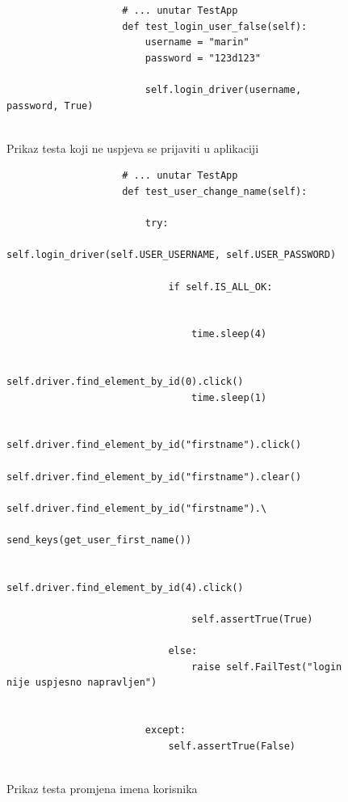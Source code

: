 			\begin{figure}[H]
				\begin{lstlisting}
					# ... unutar TestApp
				    def test_login_user_false(self):
						username = "marin"
						password = "123d123"
						
						self.login_driver(username, password, True)	
			
				\end{lstlisting}
				
			
				\centering
				\caption{Prikaz testa koji ne uspjeva se prijaviti u aplikaciji}
				\label{fig:test - sistemski - neuspjela prijava korisnika}
			\end{figure}			
			\eject 
		
			\begin{figure}[H]
								\begin{lstlisting}
					# ... unutar TestApp
					def test_user_change_name(self):
					
						try:
							self.login_driver(self.USER_USERNAME, self.USER_PASSWORD)
							
							if self.IS_ALL_OK:
							
								
								time.sleep(4)
								
								self.driver.find_element_by_id(0).click()
								time.sleep(1)
								
								self.driver.find_element_by_id("firstname").click()
								self.driver.find_element_by_id("firstname").clear()
								self.driver.find_element_by_id("firstname").\
									send_keys(get_user_first_name())
								
								self.driver.find_element_by_id(4).click()
								
								self.assertTrue(True)
							
							else:
								raise self.FailTest("login nije uspjesno napravljen")
						
						
						except:
							self.assertTrue(False)
					
				\end{lstlisting}
				
			
				\centering
				\caption{Prikaz testa promjena imena korisnika}
				\label{fig:test - sistemski - promjena imena korisnika}
			\end{figure}		
		

